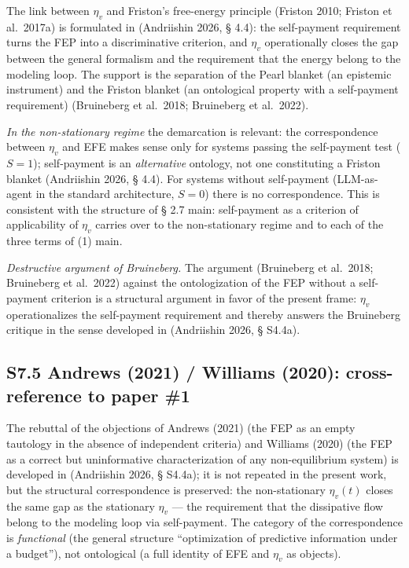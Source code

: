 \documentclass[pdflatex,sn-mathphys-ay]{sn-jnl}
\begin{document}
The link between \(\eta_v\) and Friston's free-energy principle (Friston 2010; Friston et al.~2017a) is formulated in (Andriishin 2026, § 4.4): the self-payment requirement turns the FEP into a discriminative criterion, and \(\eta_v\) operationally closes the gap between the general formalism and the requirement that the energy belong to the modeling loop. The support is the separation of the Pearl blanket (an epistemic instrument) and the Friston blanket (an ontological property with a self-payment requirement) (Bruineberg et al.~2018; Bruineberg et al.~2022).



\emph{In the non-stationary regime} the demarcation is relevant: the correspondence between \(\eta_v\) and EFE makes sense only for systems passing the self-payment test (\(S=1\)); self-payment is an \emph{alternative} ontology, not one constituting a Friston blanket (Andriishin 2026, § 4.4). For systems without self-payment (LLM-as-agent in the standard architecture, \(S=0\)) there is no correspondence. This is consistent with the structure of § 2.7 main: self-payment as a criterion of applicability of \(\eta_v\) carries over to the non-stationary regime and to each of the three terms of (1) main.



\emph{Destructive argument of Bruineberg.} The argument (Bruineberg et al.~2018; Bruineberg et al.~2022) against the ontologization of the FEP without a self-payment criterion is a structural argument in favor of the present frame: \(\eta_v\) operationalizes the self-payment requirement and thereby answers the Bruineberg critique in the sense developed in (Andriishin 2026, § S4.4a).



\subsection*{S7.5 Andrews (2021) / Williams (2020): cross-reference to paper \#1}\label{s7.5-andrews-2021-williams-2020-cross-reference-to-paper-1}



The rebuttal of the objections of Andrews (2021) (the FEP as an empty tautology in the absence of independent criteria) and Williams (2020) (the FEP as a correct but uninformative characterization of any non-equilibrium system) is developed in (Andriishin 2026, § S4.4a); it is not repeated in the present work, but the structural correspondence is preserved: the non-stationary \(\eta_v(t)\) closes the same gap as the stationary \(\eta_v\) --- the requirement that the dissipative flow belong to the modeling loop via self-payment. The category of the correspondence is \emph{functional} (the general structure ``optimization of predictive information under a budget''), not ontological (a full identity of EFE and \(\eta_v\) as objects).
\end{document}
